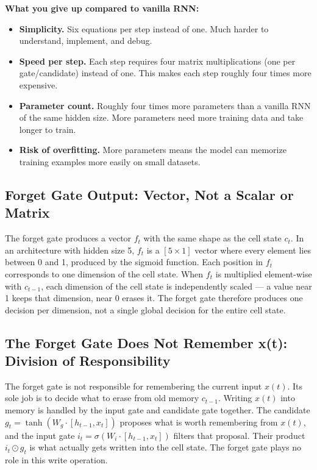 \documentclass[12pt,a4paper]{article}
\begin{document}
\textbf{What you give up compared to vanilla RNN:}

\begin{itemize}
    \item \textbf{Simplicity.} Six equations per step instead of one. Much harder to
    understand, implement, and debug.
    \item \textbf{Speed per step.} Each step requires four matrix multiplications
    (one per gate/candidate) instead of one. This makes each step roughly four times
    more expensive.
    \item \textbf{Parameter count.} Roughly four times more parameters than a vanilla
    RNN of the same hidden size. More parameters need more training data and take
    longer to train.
    \item \textbf{Risk of overfitting.} More parameters means the model can memorize
    training examples more easily on small datasets.
\end{itemize}



\subsection{Forget Gate Output: Vector, Not a Scalar or Matrix}
The forget gate produces a vector $f_t$ with the same shape as the cell state $c_t$. In an architecture with hidden size 5, $f_t$ is a $[5 \times 1]$ vector where every element lies between 0 and 1, produced by the sigmoid function. Each position in $f_t$ corresponds to one dimension of the cell state. When $f_t$ is multiplied element-wise with $c_{t-1}$, each dimension of the cell state is independently scaled --- a value near 1 keeps that dimension, near 0 erases it. The forget gate therefore produces one decision per dimension, not a single global decision for the entire cell state.

\subsection{The Forget Gate Does Not Remember x(t): Division of Responsibility}
The forget gate is not responsible for remembering the current input $x(t)$. Its sole job is to decide what to erase from old memory $c_{t-1}$. Writing $x(t)$ into memory is handled by the input gate and candidate gate together. The candidate $g_t = \tanh(W_g \cdot [h_{t-1}, x_t])$ proposes what is worth remembering from $x(t)$, and the input gate $i_t = \sigma(W_i \cdot [h_{t-1}, x_t])$ filters that proposal. Their product $i_t \odot g_t$ is what actually gets written into the cell state. The forget gate plays no role in this write operation.
\end{document}
